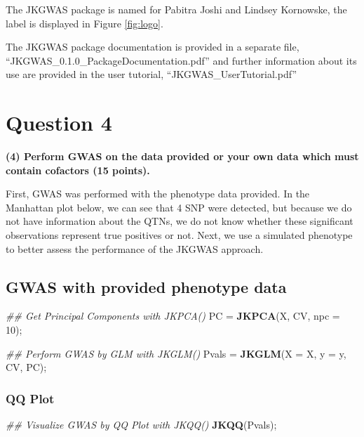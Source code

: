\documentclass[
]{article}
\newenvironment{Shaded}{\begin{snugshade}}{\end{snugshade}}
\newcommand{\CommentTok}[1]{\textcolor[rgb]{0.56,0.35,0.01}{\textit{#1}}}
\newcommand{\DataTypeTok}[1]{\textcolor[rgb]{0.13,0.29,0.53}{#1}}
\newcommand{\DecValTok}[1]{\textcolor[rgb]{0.00,0.00,0.81}{#1}}
\newcommand{\KeywordTok}[1]{\textcolor[rgb]{0.13,0.29,0.53}{\textbf{#1}}}
\newcommand{\NormalTok}[1]{#1}
\newcommand{\StringTok}[1]{\textcolor[rgb]{0.31,0.60,0.02}{#1}}
\begin{document}
The JKGWAS package is named for Pabitra Joshi and Lindsey Kornowske, the
label is displayed in Figure \ref{fig:logo}.

The JKGWAS package documentation is provided in a separate file,
``JKGWAS\_0.1.0\_PackageDocumentation.pdf'' and further information
about its use are provided in the user tutorial,
``JKGWAS\_UserTutorial.pdf''

\hypertarget{question-4}{%
\section{Question 4}\label{question-4}}

\textbf{(4) Perform GWAS on the data provided or your own data which must contain cofactors (15 points).}

First, GWAS was performed with the phenotype data provided. In the
Manhattan plot below, we can see that 4 SNP were detected, but because
we do not have information about the QTNs, we do not know whether these
significant observations represent true positives or not. Next, we use a
simulated phenotype to better assess the performance of the JKGWAS
approach.

\hypertarget{gwas-with-provided-phenotype-data}{%
\subsection{GWAS with provided phenotype
data}\label{gwas-with-provided-phenotype-data}}

\begin{Shaded}
\begin{Highlighting}[]
\CommentTok{\#\# Get Principal Components with JKPCA()}
\NormalTok{PC =}\StringTok{ }\KeywordTok{JKPCA}\NormalTok{(X, CV, }\DataTypeTok{npc =} \DecValTok{10}\NormalTok{);}

\CommentTok{\#\# Perform GWAS by GLM with JKGLM()}
\NormalTok{Pvals =}\StringTok{ }\KeywordTok{JKGLM}\NormalTok{(}\DataTypeTok{X =}\NormalTok{ X, }\DataTypeTok{y =}\NormalTok{ y, CV, PC);}
\end{Highlighting}
\end{Shaded}

\hypertarget{qq-plot}{%
\subsubsection{QQ Plot}\label{qq-plot}}

\begin{Shaded}
\begin{Highlighting}[]
\CommentTok{\#\# Visualize GWAS by QQ Plot with JKQQ()}
\KeywordTok{JKQQ}\NormalTok{(Pvals);}
\end{Highlighting}
\end{Shaded}
\end{document}
